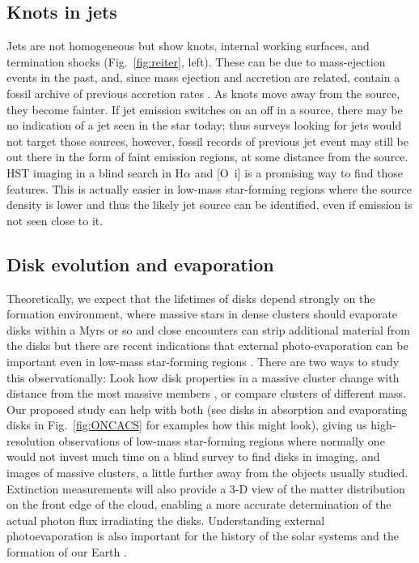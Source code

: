 \documentclass[12pt]{article}
\begin{document}
\subsection{Knots in jets}
Jets are not homogeneous but show knots, internal working surfaces, and termination shocks (Fig.~\ref{fig:reiter}, left). These can be due to mass-ejection events in the past, and, since mass ejection and accretion are related, contain a fossil archive of previous accretion rates \citep{2014A&A...563A..87E}. As knots move away from the source, they become fainter. If jet emission switches on an off in a source, there may be no indication of a jet seen in the star today; thus surveys looking for jets would not target those sources, however, fossil records of previous jet event may still be out there in the form of faint emission regions, at some distance from the source. HST imaging in a blind search in H$\alpha$ and [O~{\sc i}] is a promising way to find those features. This is actually easier in low-mass star-forming regions where the source density is lower and thus the likely jet source can be identified, even if emission is not seen close to it.

\subsection{Disk evolution and evaporation}


Theoretically, we expect that the lifetimes of disks depend strongly on the formation environment, where massive stars in dense clusters should evaporate disks within a Myrs or so and close encounters can strip additional material from the disks \citep[e.g.][]{2004ApJ...611..360A,2019MNRAS.485.1489W,2019arXiv190211094N} but there are recent indications that external photo-evaporation can be important even in low-mass star-forming regions \citep{2017MNRAS.468L.108H}.
There are two ways to study this observationally: Look how disk properties in a massive cluster change with distance from the most massive members \citep{2014ApJ...784...82M,2017AJ....153..240A,2018ApJ...860...77E}, or compare clusters of different mass. Our proposed study can help with both (see disks in absorption and evaporating disks in Fig.~\ref{fig:ONCACS} for examples how this might look), giving us high-resolution observations of low-mass star-forming regions where normally one would not invest much time on a blind survey to find disks in imaging, and images of massive clusters, a little further away from the objects usually studied. Extinction measurements will also provide a 3-D view of the matter distribution on the front edge of the cloud, enabling a more accurate determination of the actual photon flux irradiating the disks. 
Understanding external photoevaporation is also important for the history of the solar systems and the formation of our Earth \citep{2015ApJ...815..112K}.
\end{document}
